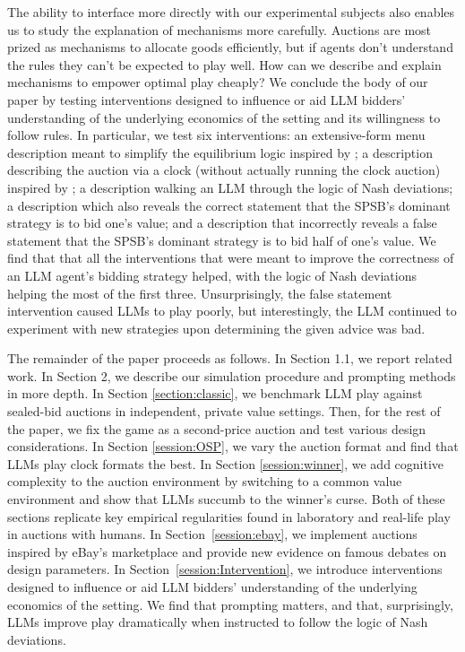 \documentclass{article} %
\begin{document}
The ability to interface more directly with our experimental subjects also enables us to study the explanation of mechanisms more carefully. Auctions are most prized as mechanisms to allocate goods efficiently, but if agents don't understand the rules they can't be expected to play well. How can we describe and explain mechanisms to empower optimal play cheaply? We conclude the body of our paper by testing interventions designed to influence or aid LLM bidders' understanding of the underlying economics of the setting and its willingness to follow rules. In particular, we test six interventions: an extensive-form menu description meant to simplify the equilibrium logic inspired by \citet{gonczarowski2023strategyproofness}; a description describing the auction via a clock (without actually running the clock auction) inspired by \citet{breitmoser2022obviousness}; a description walking an LLM through the logic of Nash deviations; a description which also reveals the correct statement that the SPSB's dominant strategy is to bid one's value; and a description that incorrectly reveals a false statement that the SPSB's dominant strategy is to bid half of one's value. We find that that all the interventions that were meant to improve the correctness of an LLM agent's bidding strategy helped, with the logic of Nash deviations helping the most of the first three. Unsurprisingly, the false statement intervention caused LLMs to play poorly, but interestingly, the LLM continued to experiment with new strategies upon determining the given advice was bad.

The remainder of the paper proceeds as follows. In Section 1.1, we report related work. In Section 2, we describe our simulation procedure and prompting methods in more depth. In Section \ref{section:classic}, we benchmark LLM play against sealed-bid auctions in independent, private value settings. Then, for the rest of the paper, we fix the game as a second-price auction and test various design considerations. In Section \ref{session:OSP}, we vary the auction format and find that LLMs play clock formats the best. In Section \ref{session:winner}, we add cognitive complexity to the auction environment by switching to a common value environment and show that LLMs succumb to the winner's curse. Both of these sections replicate key empirical regularities found in laboratory and real-life play in auctions with humans. In Section~\ref{session:ebay}, we implement auctions inspired by eBay's marketplace and provide new evidence on famous debates on design parameters. In Section~\ref{session:Intervention}, we introduce interventions designed to influence or aid LLM bidders' understanding of the underlying economics of the setting. We find that prompting matters, and that, surprisingly, LLMs improve play dramatically when instructed to follow the logic of Nash deviations.
\end{document}
